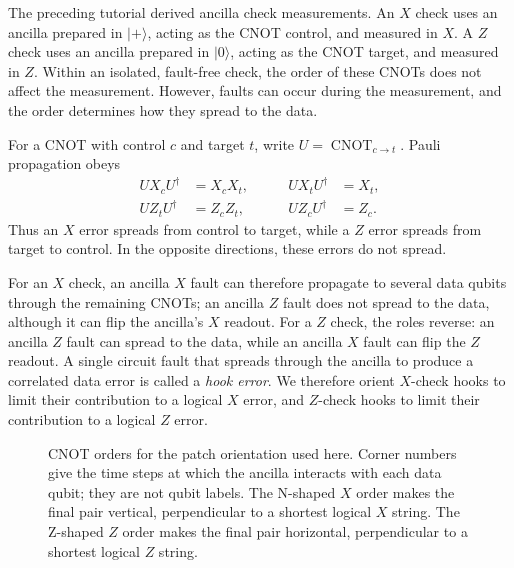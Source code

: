 \documentclass[11pt,a4paper]{article}
\newcommand{\ket}[1]{\lvert #1\rangle}
\newcommand{\cnot}{\operatorname{CNOT}}
\begin{document}
The preceding tutorial derived ancilla check measurements. An $X$ check uses an ancilla prepared in $\ket{+}$, acting as the CNOT control, and measured in $X$. A $Z$ check uses an ancilla prepared in $\ket{0}$, acting as the CNOT target, and measured in $Z$. Within an isolated, fault-free check, the order of these CNOTs does not affect the measurement. However, faults can occur during the measurement, and the order determines how they spread to the data.

For a CNOT with control $c$ and target $t$, write $U=\cnot_{c\to t}$. Pauli propagation obeys
\begin{equation}\label{eq:propagation}
\begin{aligned}
U X_c U^\dagger &= X_cX_t,
&\qquad U X_t U^\dagger &= X_t,\\
U Z_t U^\dagger &= Z_cZ_t,
&\qquad U Z_c U^\dagger &= Z_c.
\end{aligned}
\end{equation}
Thus an $X$ error spreads from control to target, while a $Z$ error spreads from target to control. In the opposite directions, these errors do not spread.

For an $X$ check, an ancilla $X$ fault can therefore propagate to several data qubits through the remaining CNOTs; an ancilla $Z$ fault does not spread to the data, although it can flip the ancilla's $X$ readout. For a $Z$ check, the roles reverse: an ancilla $Z$ fault can spread to the data, while an ancilla $X$ fault can flip the $Z$ readout. A single circuit fault that spreads through the ancilla to produce a correlated data error is called a \emph{hook error}. We therefore orient $X$-check hooks to limit their contribution to a logical $X$ error, and $Z$-check hooks to limit their contribution to a logical $Z$ error.

\begin{figure}[!ht]
\centering\schedules
\caption{CNOT orders for the patch orientation used here. Corner numbers give the time steps at which the ancilla interacts with each data qubit; they are not qubit labels. The N-shaped $X$ order makes the final pair vertical, perpendicular to a shortest logical $X$ string. The Z-shaped $Z$ order makes the final pair horizontal, perpendicular to a shortest logical $Z$ string.}
\label{fig:schedule}
\end{figure}
\end{document}
